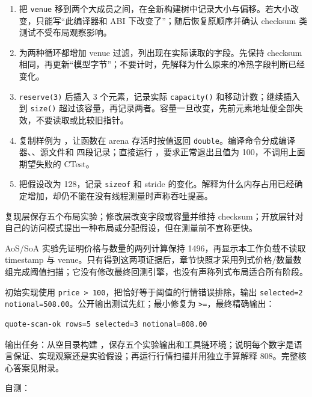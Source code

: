 \begin{enumerate}
  \item 把 \texttt{venue} 移到两个大成员之间，在全新构建树中记录大小与偏移。若大小改变，只能写“此编译器和 ABI 下改变了”；随后恢复原顺序并确认 checksum 类测试不受布局观察影响。
  \item 为两种循环都增加 venue 过滤，列出现在实际读取的字段。先保持 checksum 相同，再更新“模型字节”；不要计时，先解释为什么原来的冷热字段判断已经变化。
  \item \texttt{reserve(3)} 后插入 3 个元素，记录实际 \texttt{capacity()} 和移动计数；继续插入到 \texttt{size()} 超过该容量，再记录两者。容量一旦改变，先前元素地址便全部失效，不要读取或比较旧指针。
  \item 复制样例为 ，让函数在 arena 存活时按值返回 \texttt{double}。编译命令分成编译器、、源文件和  四段记录；直接运行 ，要求正常退出且值为 100，不调用上面期望失败的 CTest。
  \item 把假设改为 128，记录 \texttt{sizeof} 和 stride 的变化。解释为什么内存占用已经确定增加，却仍不能在没有线程测量时声称吞吐提高。
\end{enumerate}

复现层保存五个布局实验；修改层改变字段或容量并维持 checksum；开放层针对自己的访问模式提出一种布局或分配假设，但在测量前不宣称更快。

AoS/SoA 实验先证明价格与数量的两列计算保持 1496，再显示本工作负载不读取 timestamp 与 venue。只有得到这两项证据后，章节快照才采用列式价格/数量数组完成阈值扫描；它没有修改最终回测引擎，也没有声称列式布局适合所有阶段。

\newpage


初始实现使用 \texttt{price > 100}，把恰好等于阈值的行情错误排除，输出 \texttt{selected=2 notional=508.00}。公开输出测试先红；最小修复为 \texttt{>=}，最终精确输出：

\begin{lstlisting}[numbers=none]
quote-scan-ok rows=5 selected=3 notional=808.00
\end{lstlisting}

输出任务：从空目录构建 ，保存五个实验输出和工具链环境；说明每个数字是语言保证、实现观察还是实验假设；再运行行情扫描并用独立手算解释 808。完整核心答案见附录。

自测：

